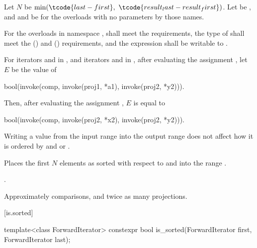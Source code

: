 \begin{itemdescr}
\pnum
Let $N$ be $\min(\tcode{last - first}, \ \tcode{result_last - result_first})$.
Let  be , and
 and  be 
for the overloads with no parameters by those names.

\pnum
\requires
For the overloads in namespace ,
 shall meet
the  requirements,
the type of  shall meet
the  () and
 () requirements,
and the expression 
shall be writable to .

\pnum
\expects
For iterators  and  in , and
iterators  and  in ,
after evaluating the assignment , let $E$ be the value of
\begin{codeblock}
bool(invoke(comp, invoke(proj1, *a1), invoke(proj2, *y2))).
\end{codeblock}
Then, after evaluating the assignment , $E$ is equal to
\begin{codeblock}
bool(invoke(comp, invoke(proj2, *x2), invoke(proj2, *y2))).
\end{codeblock}
\begin{note}
Writing a value from the input range into the output range does not affect
how it is ordered by  and  or .
\end{note}

\pnum
\effects
Places the first $N$ elements
as sorted with respect to  and 
into the range .

\pnum
\returns
{}.

\pnum
\complexity
Approximately  comparisons,
and twice as many projections.
\end{itemdescr}

[is.sorted]{}

%
\begin{itemdecl}
template<class ForwardIterator>
  constexpr bool is_sorted(ForwardIterator first, ForwardIterator last);
\end{itemdecl}

